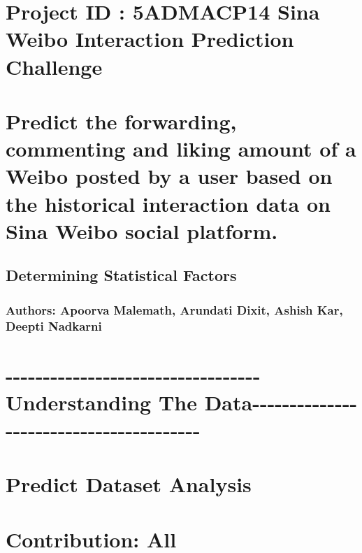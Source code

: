\documentclass[11pt]{article}
\begin{document}
\section{Project ID : 5ADMACP14 Sina Weibo Interaction Prediction
Challenge}\label{project-id-5admacp14-sina-weibo-interaction-prediction-challenge}

\section{Predict the forwarding, commenting and liking amount of a Weibo
posted by a user based on the historical interaction data on Sina Weibo
social
platform.}\label{predict-the-forwarding-commenting-and-liking-amount-of-a-weibo-posted-by-a-user-based-on-the-historical-interaction-data-on-sina-weibo-social-platform.}

\subsection{Determining Statistical
Factors}\label{determining-statistical-factors}

\subsubsection{Authors: Apoorva Malemath, Arundati Dixit, Ashish Kar,
Deepti
Nadkarni}\label{authors-apoorva-malemath-arundati-dixit-ashish-kar-deepti-nadkarni}

    \section{-\/-\/-\/-\/-\/-\/-\/-\/-\/-\/-\/-\/-\/-\/-\/-\/-\/-\/-\/-\/-\/-\/-\/-\/-\/-\/-\/-\/-\/-\/-\/-\/-\/-Understanding
The
Data-\/-\/-\/-\/-\/-\/-\/-\/-\/-\/-\/-\/-\/-\/-\/-\/-\/-\/-\/-\/-\/-\/-\/-\/-\/-\/-\/-\/-\/-\/-\/-\/-\/-\/-\/-\/-\/-\/-\/-}\label{understanding-the-data----------------------------------------}

    \section{Predict Dataset Analysis}\label{predict-dataset-analysis}

\section{Contribution: All}\label{contribution-all}
\end{document}
